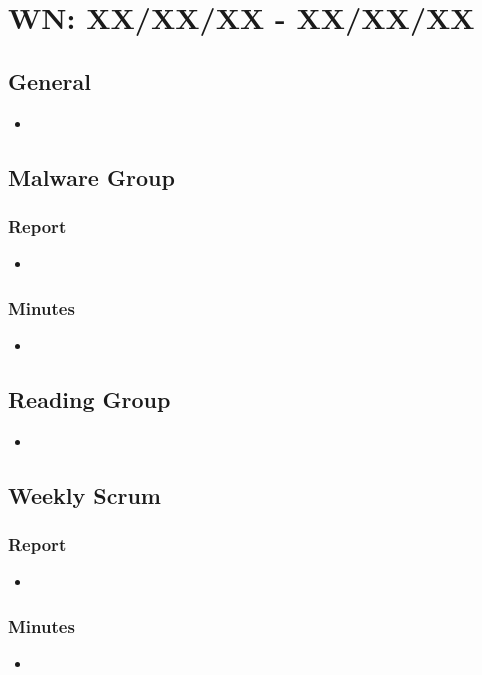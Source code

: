 \documentclass{article}
\begin{document}



\section*{WN: XX/XX/XX - XX/XX/XX}

\subsection*{General}
\begin{itemize}
	\item 
\end{itemize}

\subsection*{Malware Group}
\subsubsection*{Report}
\begin{itemize}
	\item 
\end{itemize}
\subsubsection*{Minutes}
\begin{itemize}
	\item 
\end{itemize}

\subsection*{Reading Group}
\begin{itemize}
	\item 
\end{itemize}

\subsection*{Weekly Scrum}
\subsubsection*{Report}
\begin{itemize}
	\item 
\end{itemize}
\subsubsection*{Minutes}
\begin{itemize}
	\item 
\end{itemize}

\pagebreak


\end{document}
